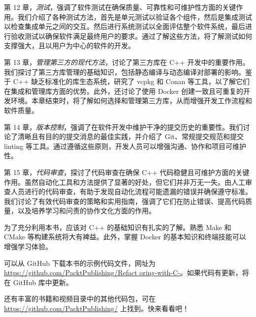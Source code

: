 第 12 章，\textit{测试}，强调了软件测试在确保质量、可靠性和可维护性方面的关键作用。我们介绍了各种测试方法，首先是单元测试以验证各个组件，然后是集成测试以检查集成单元之间的交互。然后进行系统测试以全面评估整个软件系统，最后进行验收测试以确保软件满足最终用户的要求。通过了解这些方法，将了解测试如何支撑强大，且以用户为中心的软件的开发。

第 13 章，\textit{管理第三方的现代方法}，讨论了第三方库在 C++ 开发中的重要作用。我们探讨了第三方库管理的基础知识，包括静态编译与动态编译对部署的影响。鉴于 C++ 缺乏标准化的库生态系统，研究了 vcpkg 和 Conan 等工具，以了解它们在集成和管理库方面的优势。此外，还讨论了使用 Docker 创建一致且可重复的开发环境。本章结束时，将了解如何选择和管理第三方库，从而增强开发工作流程和软件质量。

第 14 章，\textit{版本控制}，强调了在软件开发中维护干净的提交历史的重要性。我们讨论了清晰且有目的的提交消息的最佳实践，并介绍了 Git、常规提交规范和提交 linting 等工具。通过遵循这些原则，开发人员可以增强沟通、协作和项目可维护性。

第 15 章，\textit{代码审查}，探讨了代码审查在确保 C++ 代码稳健且可维护方面的关键作用。虽然自动化工具和方法提供了显著的好处，但它们并非万无一失。由人工审查人员进行的代码审查，有助于发现自动化流程可能遗漏的错误并确保遵守标准。我们讨论了有效代码审查的策略和实用指南，强调了它们在防止错误、提高代码质量，以及培养学习和问责的协作文化方面的作用。


为了充分利用本书，应该对 C++ 的基础知识有扎实的了解。熟悉 Make 和 CMake 等构建系统将大有裨益。此外，掌握 Docker 的基本知识和终端技能可以增强学习体验。


可以从 GitHub 下载本书的示例代码文件，网址为 \url{https://github.com/PacktPublishing/Refact oring-with-C-}。如果代码有更新，将在 GitHub 库中更新。

还有丰富的书籍和视频目录中的其他代码包，可在 \url{https://github.com/PacktPublishing/} 上找到。快来看看吧！
